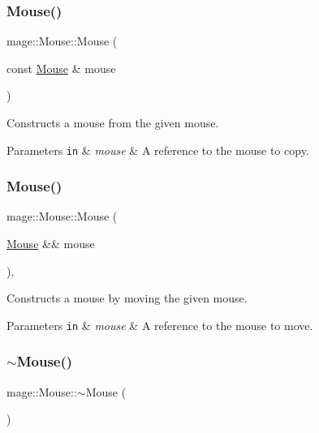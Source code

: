 \subsubsection{\texorpdfstring{Mouse()}{Mouse()}\hspace{0.1cm}{\footnotesize\ttfamily [2/3]}}
{\footnotesize\ttfamily mage\+::\+Mouse\+::\+Mouse (\begin{DoxyParamCaption}\item[{const \hyperlink{classmage_1_1_mouse}{Mouse} \&}]{mouse }\end{DoxyParamCaption})\hspace{0.3cm}{\ttfamily [delete]}}

Constructs a mouse from the given mouse.


\begin{DoxyParams}[1]{Parameters}
\mbox{\tt in}  & {\em mouse} & A reference to the mouse to copy. \\
\hline
\end{DoxyParams}
\hypertarget{classmage_1_1_mouse_aab728705e2e290da23fef77f60b3fc2c}{}\label{classmage_1_1_mouse_aab728705e2e290da23fef77f60b3fc2c} 
\subsubsection{\texorpdfstring{Mouse()}{Mouse()}\hspace{0.1cm}{\footnotesize\ttfamily [3/3]}}
{\footnotesize\ttfamily mage\+::\+Mouse\+::\+Mouse (\begin{DoxyParamCaption}\item[{\hyperlink{classmage_1_1_mouse}{Mouse} \&\&}]{mouse }\end{DoxyParamCaption})\hspace{0.3cm}{\ttfamily [default]}, {\ttfamily [noexcept]}}

Constructs a mouse by moving the given mouse.


\begin{DoxyParams}[1]{Parameters}
\mbox{\tt in}  & {\em mouse} & A reference to the mouse to move. \\
\hline
\end{DoxyParams}
\hypertarget{classmage_1_1_mouse_a855f1075ae774c8417d3da7a1e02d580}{}\label{classmage_1_1_mouse_a855f1075ae774c8417d3da7a1e02d580} 
\subsubsection{\texorpdfstring{$\sim$\+Mouse()}{~Mouse()}}
{\footnotesize\ttfamily mage\+::\+Mouse\+::$\sim$\+Mouse (\begin{DoxyParamCaption}{ }\end{DoxyParamCaption})\hspace{0.3cm}{\ttfamily [default]}}

